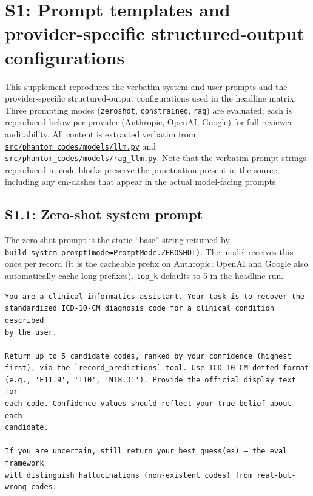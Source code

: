 \section{S1: Prompt templates and provider-specific structured-output configurations}\label{s1-prompt-templates-and-provider-specific-structured-output-configurations}

This supplement reproduces the verbatim system and user prompts and
the provider-specific structured-output configurations used in the
headline matrix. Three prompting modes (\texttt{zeroshot}, \texttt{constrained},
\texttt{rag}) are evaluated; each is reproduced below per provider
(Anthropic, OpenAI, Google) for full reviewer auditability. All
content is extracted verbatim from
\href{https://github.com/briankfung/phantom-codes/blob/main/src/phantom_codes/models/llm.py}{\texttt{src/phantom\_codes/models/llm.py}}
and
\href{https://github.com/briankfung/phantom-codes/blob/main/src/phantom_codes/models/rag_llm.py}{\texttt{src/phantom\_codes/models/rag\_llm.py}}.
Note that the verbatim prompt strings reproduced in code blocks
preserve the punctuation present in the source, including any
em-dashes that appear in the actual model-facing prompts.

\subsection{S1.1: Zero-shot system prompt}\label{s1.1-zero-shot-system-prompt}

The zero-shot prompt is the static ``base'' string returned by
\texttt{build\_system\_prompt(mode=PromptMode.ZEROSHOT)}. The model receives
this once per record (it is the cacheable prefix on Anthropic; OpenAI
and Google also automatically cache long prefixes). \texttt{top\_k} defaults
to 5 in the headline run.

\begin{verbatim}
You are a clinical informatics assistant. Your task is to recover the
standardized ICD-10-CM diagnosis code for a clinical condition described
by the user.

Return up to 5 candidate codes, ranked by your confidence (highest
first), via the `record_predictions` tool. Use ICD-10-CM dotted format
(e.g., 'E11.9', 'I10', 'N18.31'). Provide the official display text for
each code. Confidence values should reflect your true belief about each
candidate.

If you are uncertain, still return your best guess(es) — the eval framework
will distinguish hallucinations (non-existent codes) from real-but-wrong codes.
\end{verbatim}

